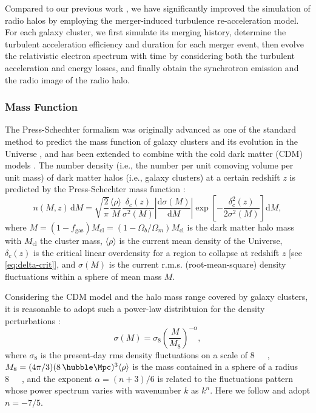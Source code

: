 \documentclass[modern]{aastex62}
\newcommand{\R}[1]{\mathrm{#1}}
\newcommand{\D}[1]{\R{d} #1}
\newcommand{\diff}[2]{\frac{\D{#1}}{\D{#2}}}
\begin{document}
Compared to our previous work \citep{wang2010},
we have significantly improved the simulation of radio halos by
employing the merger-induced turbulence re-acceleration model.
For each galaxy cluster, we first simulate its merging history,
determine the turbulent acceleration efficiency and duration for each
merger event, then evolve the relativistic electron spectrum with time
by considering both the turbulent acceleration and energy losses, and
finally obtain the synchrotron emission and the radio image of the
radio halo.

\subsubsection{Mass Function}
\label{sec:distributions}

The Press-Schechter formalism was originally advanced as one of the standard
method to predict the mass function of galaxy clusters and its evolution
in the Universe \citep{press1974}, and has been extended to combine with
the cold dark matter (CDM) models \citep[e.g.,][]{bond1991,lacey1993}.
The number density (i.e., the number per unit comoving volume per unit
mass) of dark matter halos (i.e., galaxy clusters) at a certain redshift
$z$ is predicted by the Press-Schechter mass function \citep{press1974}:
\begin{equation}
  \label{eq:ps-mass-func}
  n(M, z) \,\D{M} = \sqrt{\frac{2}{\pi}} \frac{\langle{\rho}\rangle}{M}
  \frac{\delta_c(z)}{\sigma^2(M)} \left| \diff{\sigma(M)}{M} \right|
  \exp\!\left[ -\frac{\delta_c^2(z)}{2\sigma^2(M)} \right] \D{M},
\end{equation}
where
$M = (1 - f_{\R{gas}}) M_{\R{cl}} = (1 - \Omega_b/\Omega_m) M_{\R{cl}}$
is the dark matter halo mass with $M_{\R{cl}}$ the cluster mass,
$\langle {\rho} \rangle$ is the current mean density of the Universe,
$\delta_c(z)$ is the critical linear overdensity for a region to collapse
at redshift $z$ [see \autoref{eq:delta-crit}],
and $\sigma(M)$ is the current r.m.s. (root-mean-square) density fluctuations
within a sphere of mean mass $M$.

Considering the CDM model and the halo mass range covered by galaxy
clusters, it is reasonable to adopt such a power-law distribtuion
for the density perturbations \citep{sarazin2002,randall2002}:
\begin{equation}
  \label{eq:sigma-mass}
  \sigma(M) = \sigma_8 \left( \frac{M}{M_8} \right)^{-\alpha},
\end{equation}
where $\sigma_8$ is the present-day rms density fluctuations on a
scale of \SI{8}{\per\hubble\Mpc},
$M_8 = (4\pi/3)(8 \,\si{\per\hubble\Mpc})^3 \langle{\rho}\rangle$
is the mass contained in a sphere of a radius \SI{8}{\per\hubble\Mpc},
and the exponent $\alpha = (n+3)/6$ is related to the fluctuations
pattern whose power spectrum varies with wavenumber $k$ as $k^n$.
Here we follow \citet{randall2002} and adopt $n = -7/5$.
\end{document}

